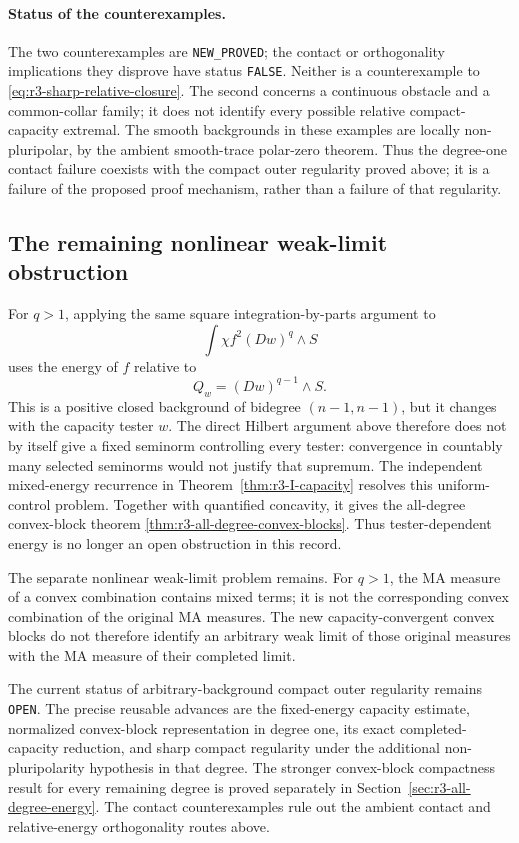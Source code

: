 \documentclass[11pt,a4paper]{article}
\numberwithin{equation}{section}
\theoremstyle{definition}
\theoremstyle{remark}
\begin{document}
\paragraph{Status of the counterexamples.}
The two counterexamples are \texttt{NEW\_PROVED}; the contact or
orthogonality implications they disprove have status
\texttt{FALSE}. Neither is a counterexample to
\eqref{eq:r3-sharp-relative-closure}. The second concerns a
continuous obstacle and a common-collar family; it does not
identify every possible relative compact-capacity extremal.
The smooth backgrounds in these examples are locally
non-pluripolar, by the ambient smooth-trace polar-zero theorem.
Thus the degree-one contact failure coexists with the compact
outer regularity proved above; it is a failure of the proposed
proof mechanism, rather than a failure of that regularity.

\subsection{The remaining nonlinear weak-limit obstruction}

For $q>1$, applying the same square integration-by-parts argument
to
\[
 \int\chi f^2(Dw)^q\wedge S
\]
uses the energy of $f$ relative to
\[
 Q_w=(Dw)^{q-1}\wedge S.
\]
This is a positive closed background of bidegree $(n-1,n-1)$,
but it changes with the capacity tester $w$. The direct Hilbert
argument above therefore does not by itself give a fixed
seminorm controlling every tester: convergence in countably
many selected seminorms would not justify that supremum.
The independent mixed-energy recurrence in
Theorem~\ref{thm:r3-I-capacity} resolves this uniform-control
problem. Together with quantified concavity, it gives the
all-degree convex-block theorem
\ref{thm:r3-all-degree-convex-blocks}. Thus tester-dependent
energy is no longer an open obstruction in this record.

The separate nonlinear weak-limit problem remains. For $q>1$,
the MA measure of a convex combination contains mixed terms;
it is not the corresponding convex combination of the original
MA measures. The new capacity-convergent convex blocks do not
therefore identify an arbitrary weak limit of those original
measures with the MA measure of their completed limit.

The current status of arbitrary-background compact outer
regularity remains \texttt{OPEN}. The precise reusable advances
are the fixed-energy capacity estimate, normalized convex-block
representation in degree one, its exact completed-capacity
reduction, and sharp compact regularity under the additional
non-pluripolarity hypothesis in that degree. The stronger
convex-block compactness result for every remaining degree is
proved separately in Section~\ref{sec:r3-all-degree-energy}.
The contact
counterexamples rule out the ambient contact and relative-energy
orthogonality routes above.
\end{document}
